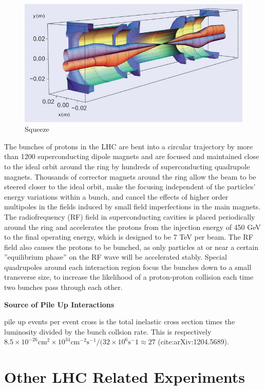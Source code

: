 \begin{figure}
\begin{center}
\includegraphics[width=.7\textwidth]{pics/beam_squeeze}
\caption{Squeeze}
\end{center}
\end{figure}




The bunches of protons in the LHC are bent into a circular trajectory by more than 1200
 superconducting dipole magnets and are focused and maintained close to the ideal
 orbit around the ring by hundreds of superconducting quadrupole magnets. 
Thousands of corrector magnets around the ring allow the beam to be steered closer 
to the ideal orbit, make the focusing independent of the particles’ energy variations
 within a bunch, and cancel the effects of higher order multipoles in the fields induced 
by small field imperfections in the main magnets. 
The radiofrequency (RF) field in superconducting cavities is placed periodically around 
the ring and accelerates the protons from the injection energy of 450 GeV to the final
 operating energy, which is designed to be 7 TeV per beam. The RF field also causes the
 protons to be bunched, as only particles at or near a certain ”equilibrium phase” on 
the RF wave will be accelerated stably. Special quadrupoles around each interaction region
 focus the bunches down to a small transverse size, to increase the likelihood of a
 proton-proton collision each time two bunches pass through each other.


\textbf{Source of Pile Up Interactions}

pile up events per event cross is the total inelastic cross section times the luminosity divided by the bunch collsion rate. This is respectively $8.5\times 10^{-26}\text{cm}^2 \times 10^{34}\text{cm}^{-2}\text{s}^{-1}/ (32 \times 10^6 \text{s}^-1 \approx 27$ (cite:arXiv:1204.5689). 

\section{Other LHC Related Experiments}

